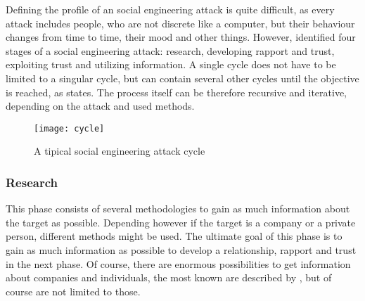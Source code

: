 Defining the profile of an social engineering attack is quite difficult, as
every attack includes people, who are not discrete like a computer, but their
behaviour changes from time to time, their mood and other things. However,
\cite{mitnick2003} identified four stages of a social engineering attack:
research, developing rapport and trust, exploiting trust and utilizing
information. A single cycle does not have to be limited to a singular cycle, but
can contain several other cycles until the objective is reached, as
\cite{thornburgh2004} states. The process itself can be therefore recursive and
iterative, depending on the attack and used methods.


\begin{figure}
  \begin{center}
    \texttt{[image: cycle]}
    \caption{A tipical social engineering attack cycle}
  \end{center}
\end{figure}

\subsubsection{Research}

This phase consists of several methodologies to gain as much information about
the target as possible. Depending however if the target is a company or a
private person, different methods might be used. The ultimate goal of this
phase is to gain as much information as possible to develop a relationship,
rapport and trust in the next phase. Of course, there are enormous
possibilities to get information about companies and individuals, the most
known are described by \cite{jones2004,mitnick2003,thornburgh2004}, but of
course are not limited to those.

